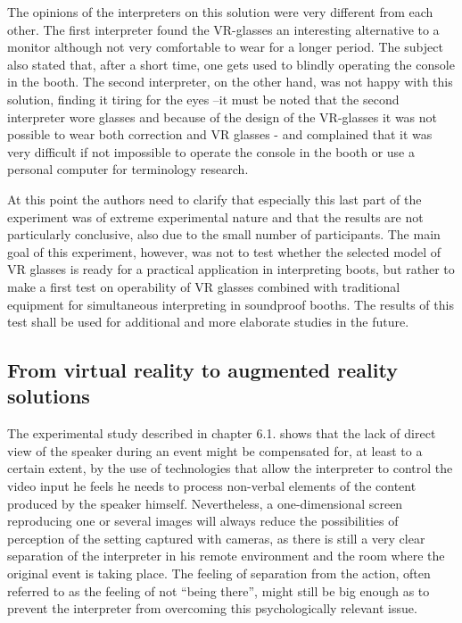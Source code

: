 \documentclass[output=paper]{langsci/langscibook}
\begin{document}
The opinions of the interpreters on this solution were very different from each other. The first interpreter found the VR-glasses an interesting alternative to a monitor although not very comfortable to wear for a longer period. The subject also stated that, after a short time, one gets used to blindly operating the console in the booth. The second interpreter, on the other hand, was not happy with this solution, finding it tiring for the eyes –it must be noted that the second interpreter wore glasses and because of the design of the VR-glasses it was not possible to wear both correction and VR glasses - and complained that it was very difficult if not impossible to operate the console in the booth or use a personal computer for terminology research.

At this point the authors need to clarify that especially this last part of the experiment was of extreme experimental nature and that the results are not particularly conclusive, also due to the small number of participants. The main goal of this experiment, however, was not to test whether the selected model of VR glasses is ready for a practical application in interpreting boots, but rather to make a first test on operability of VR glasses combined with traditional equipment for simultaneous interpreting in soundproof booths. The results of this test shall be used for additional and more elaborate studies in the future.

\subsection{From virtual reality to augmented reality solutions}

The experimental study described in chapter 6.1. shows that the lack of direct view of the speaker during an event might be compensated for, at least to a certain extent, by the use of technologies that allow the interpreter to control the video input he feels he needs to process non-verbal elements of the content produced by the speaker himself. Nevertheless, a one-dimensional screen reproducing one or several images will always reduce the possibilities of perception of the setting captured with cameras, as there is still a very clear separation of the interpreter in his remote environment and the room where the original event is taking place. The feeling of separation from the action, often referred to as the feeling of not “being there”, might still be big enough as to prevent the interpreter from overcoming this psychologically relevant issue. 
\end{document}
